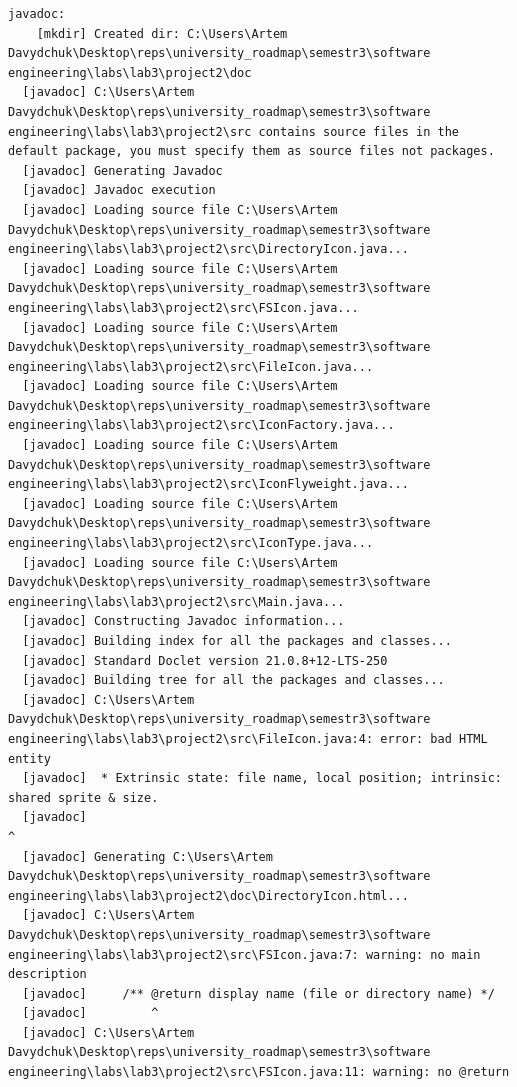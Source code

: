 \documentclass[12pt,a4paper]{article}
\begin{document}
\begin{verbatim}
javadoc:
    [mkdir] Created dir: C:\Users\Artem Davydchuk\Desktop\reps\university_roadmap\semestr3\software engineering\labs\lab3\project2\doc
  [javadoc] C:\Users\Artem Davydchuk\Desktop\reps\university_roadmap\semestr3\software engineering\labs\lab3\project2\src contains source files in the default package, you must specify them as source files not packages.
  [javadoc] Generating Javadoc
  [javadoc] Javadoc execution
  [javadoc] Loading source file C:\Users\Artem Davydchuk\Desktop\reps\university_roadmap\semestr3\software engineering\labs\lab3\project2\src\DirectoryIcon.java...
  [javadoc] Loading source file C:\Users\Artem Davydchuk\Desktop\reps\university_roadmap\semestr3\software engineering\labs\lab3\project2\src\FSIcon.java...
  [javadoc] Loading source file C:\Users\Artem Davydchuk\Desktop\reps\university_roadmap\semestr3\software engineering\labs\lab3\project2\src\FileIcon.java...
  [javadoc] Loading source file C:\Users\Artem Davydchuk\Desktop\reps\university_roadmap\semestr3\software engineering\labs\lab3\project2\src\IconFactory.java...
  [javadoc] Loading source file C:\Users\Artem Davydchuk\Desktop\reps\university_roadmap\semestr3\software engineering\labs\lab3\project2\src\IconFlyweight.java...
  [javadoc] Loading source file C:\Users\Artem Davydchuk\Desktop\reps\university_roadmap\semestr3\software engineering\labs\lab3\project2\src\IconType.java...
  [javadoc] Loading source file C:\Users\Artem Davydchuk\Desktop\reps\university_roadmap\semestr3\software engineering\labs\lab3\project2\src\Main.java...
  [javadoc] Constructing Javadoc information...
  [javadoc] Building index for all the packages and classes...
  [javadoc] Standard Doclet version 21.0.8+12-LTS-250
  [javadoc] Building tree for all the packages and classes...
  [javadoc] C:\Users\Artem Davydchuk\Desktop\reps\university_roadmap\semestr3\software engineering\labs\lab3\project2\src\FileIcon.java:4: error: bad HTML entity
  [javadoc]  * Extrinsic state: file name, local position; intrinsic: shared sprite & size.
  [javadoc]                                                                         ^
  [javadoc] Generating C:\Users\Artem Davydchuk\Desktop\reps\university_roadmap\semestr3\software engineering\labs\lab3\project2\doc\DirectoryIcon.html...
  [javadoc] C:\Users\Artem Davydchuk\Desktop\reps\university_roadmap\semestr3\software engineering\labs\lab3\project2\src\FSIcon.java:7: warning: no main description
  [javadoc]     /** @return display name (file or directory name) */
  [javadoc]         ^
  [javadoc] C:\Users\Artem Davydchuk\Desktop\reps\university_roadmap\semestr3\software engineering\labs\lab3\project2\src\FSIcon.java:11: warning: no @return

\end{verbatim}
\end{document}
